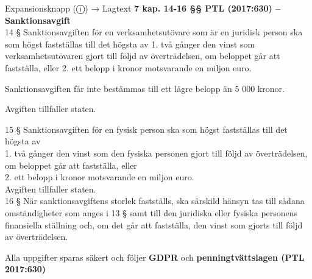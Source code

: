 \documentclass[10pt]{beamer}
\begin{document}
\begin{frame}[label=intro]
  \begin{alertblock}{Expansionsknapp (ⓘ) → Lagtext}
    \tiny \textbf{7 kap. 14-16 §§ PTL (2017:630) – Sanktionsavgift}\\[0.2cm]

    \tiny 14 §   Sanktionsavgiften för en verksamhetsutövare som är en juridisk person ska som högst fastställas till det högsta av
    \tiny 1. två gånger den vinst som verksamhetsutövaren gjort till följd av överträdelsen, om beloppet går att fastställa, eller
    \tiny 2. ett belopp i kronor motsvarande en miljon euro.

    \tiny Sanktionsavgiften får inte bestämmas till ett lägre belopp än 5 000 kronor.

    \tiny Avgiften tillfaller staten.

    \tiny 15 §   Sanktionsavgiften för en fysisk person ska som högst fastställas till det högsta av\\
    \tiny 1. två gånger den vinst som den fysiska personen gjort till följd av överträdelsen, 
    om beloppet går att fastställa, eller\\
    \tiny 2. ett belopp i kronor motsvarande en miljon euro.\\

    \tiny Avgiften tillfaller staten.\\

    \tiny 16 §   När sanktionsavgiftens storlek fastställs, ska särskild hänsyn tas till sådana 
    omständigheter som anges i 13 § samt till den juridiska eller fysiska personens finansiella 
    ställning och, om det går att fastställa, den vinst som gjorts till följd av överträdelsen.
  \end{alertblock}

  \vspace{0.5cm}
  \begin{flushright}
    \hyperlink{riskfragor-steg1}{}
  \end{flushright}
  
  \vspace{0.2cm}
  \begin{center}
    \tiny Alla uppgifter sparas säkert och följer \textbf{GDPR} och \textbf{penningtvättslagen (PTL 2017:630)}
  \end{center}
  
\end{frame}

\end{document}
